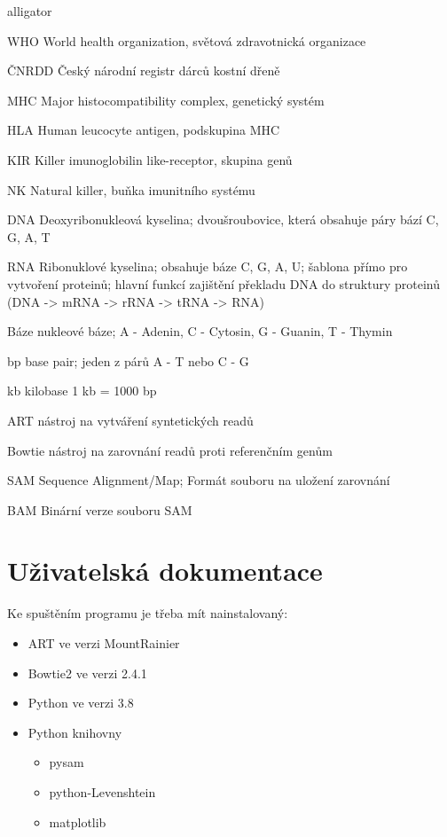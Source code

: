 \documentclass[czech,DP]{thesiskiv}
\numberwithin{equation}{section}
\begin{document}
\begin{labeling}{alligator}
	\item [WHO] World health organization, světová zdravotnická organizace
	\item [ČNRDD] Český národní registr dárců kostní dřeně
	\item [MHC] Major histocompatibility complex, genetický systém	
	\item [HLA] Human leucocyte antigen, podskupina MHC
	\item [KIR] Killer imunoglobilin like-receptor, skupina genů
	\item [NK] Natural killer, buňka imunitního systému
	\item [DNA] Deoxyribonukleová kyselina; dvoušroubovice, která obsahuje páry bází C, G, A, T 
	\item [RNA] Ribonuklové kyselina; obsahuje báze C, G, A, U; šablona přímo pro vytvoření proteinů; hlavní funkcí zajištění překladu DNA do struktury proteinů (DNA -> mRNA -> rRNA -> tRNA -> RNA) 
	\item [Báze] nukleové báze; A - Adenin, C - Cytosin, G - Guanin, T - Thymin
	\item [bp] base pair; jeden z párů A - T nebo C - G
	\item [kb] kilobase 1 kb = 1000 bp
	\item [ART] nástroj na vytváření syntetických readů
	\item [Bowtie] nástroj na zarovnání readů proti referenčním genům
	\item [SAM] Sequence Alignment/Map; Formát souboru na uložení zarovnání
	\item [BAM] Binární verze souboru SAM
\end{labeling}


% 
%
\nocite{*}

{\raggedright\small

}


\appendix
\chapter{Uživatelská dokumentace}
Ke spuštěním programu je třeba mít nainstalovaný:
\begin{itemize}
\item ART ve verzi MountRainier
\item Bowtie2 ve verzi 2.4.1
\item Python ve verzi 3.8
\item Python knihovny 
	\begin{itemize}
		\item pysam 
		\item python-Levenshtein
		\item matplotlib
	\end{itemize}
\end{itemize}
\end{document}
